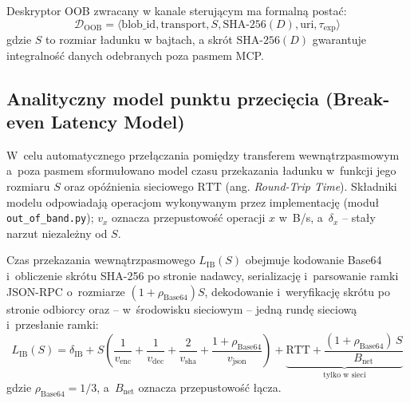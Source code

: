 Deskryptor OOB zwracany w kanale sterującym ma formalną postać:
\begin{equation}
\mathcal{D}_{\text{OOB}} = \langle \text{blob\_id}, \text{transport}, S, \text{SHA-256}(D), \text{uri}, \tau_{\text{exp}} \rangle
\label{eq:oob_descriptor_formal}
\end{equation}
gdzie $S$ to rozmiar ładunku w bajtach, a skrót $\text{SHA-256}(D)$ gwarantuje integralność danych odebranych poza pasmem MCP.

\subsection{Analityczny model punktu przecięcia (Break-even Latency Model)}
\label{subsec:projekt_crossover_model}

W~celu automatycznego przełączania pomiędzy transferem wewnątrzpasmowym a~poza pasmem sformułowano model czasu przekazania ładunku w~funkcji jego rozmiaru $S$ oraz opóźnienia sieciowego $\text{RTT}$ (ang. \emph{Round-Trip Time}). Składniki modelu odpowiadają operacjom wykonywanym przez implementację (moduł \texttt{out\_of\_band.py}); $v_x$ oznacza przepustowość operacji $x$ w~B/s, a~$\delta_x$ -- stały narzut niezależny od $S$.

Czas przekazania wewnątrzpasmowego $L_{\text{IB}}(S)$ obejmuje kodowanie Base64 i~obliczenie skrótu SHA-256 po stronie nadawcy, serializację i~parsowanie ramki JSON-RPC o~rozmiarze $(1+\rho_{\text{Base64}})S$, dekodowanie i~weryfikację skrótu po stronie odbiorcy oraz -- w~środowisku sieciowym -- jedną rundę sieciową i~przesłanie ramki:
\begin{equation}
L_{\text{IB}}(S) = \delta_{\text{IB}} + S \left( \frac{1}{v_{\text{enc}}} + \frac{1}{v_{\text{dec}}} + \frac{2}{v_{\text{sha}}} + \frac{1+\rho_{\text{Base64}}}{v_{\text{json}}} \right) + \underbrace{\text{RTT} + \frac{(1+\rho_{\text{Base64}})\,S}{B_{\text{net}}}}_{\text{tylko w~sieci}}
\label{eq:latency_in_band}
\end{equation}
gdzie $\rho_{\text{Base64}} = 1/3$, a~$B_{\text{net}}$ oznacza przepustowość łącza.


